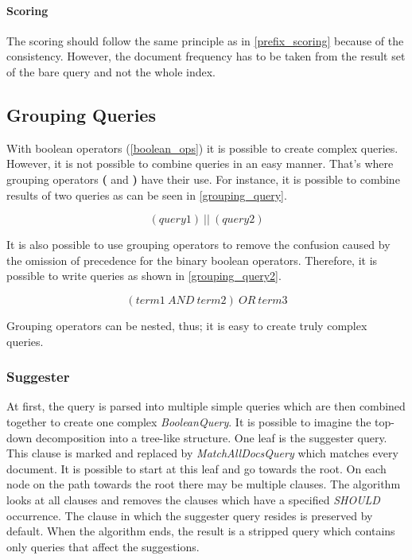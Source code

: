 \paragraph{Scoring}
The scoring should follow the same principle as in \ref{prefix_scoring} because of the consistency. However,
the document frequency has to be taken from the result set of the bare query and not the whole index.

\subsection{Grouping Queries}
\label{grouping_queries}
With boolean operators (\ref{boolean_ops}) it is possible to create complex queries. However, it is not possible to
combine queries in an easy manner. That's where grouping operators \textbf{(} and \textbf{)} have their use. For instance,
it is possible to combine results of two queries as can be seen in \ref{grouping_query}.

\begin{equation}
\label{grouping_query}
(query1)\ \vert\vert\ (query2)
\end{equation}

It is also possible to use grouping operators to remove the confusion caused by the omission of precedence for the binary
boolean operators. Therefore, it is possible to write queries as shown in \ref{grouping_query2}.

\begin{equation}
\label{grouping_query2}
(term1\ AND\ term2)\ OR\ term3
\end{equation}

Grouping operators can be nested, thus; it is easy to create truly complex queries.

\subsubsection{Suggester}

At first, the query is parsed into multiple simple queries which are then combined together to create one complex
\textit{BooleanQuery}. It is possible to imagine the top-down decomposition into a tree-like structure.
One leaf is the suggester query. This clause is marked and replaced by \textit{MatchAllDocsQuery} which matches every
document. %
It is possible to start at this leaf and go towards the root. On each node on the path towards the root there may be
multiple clauses. The algorithm looks at all clauses and removes the clauses which have a specified \textit{SHOULD}
occurrence. The clause in which the suggester query resides is preserved by default. When the algorithm ends, the result
is a stripped query which contains only queries that affect the suggestions.

